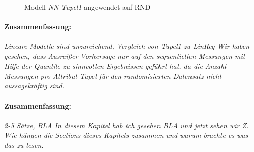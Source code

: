 \documentclass[
	12pt,
	a4paper,
	BCOR10mm,
	DIV14,
	listof=totoc,
	bibliography=totoc,
	headsepline
]{scrreprt}
\begin{document}
\begin{figure}
	\centering
	\\
	\hfill
	\caption{Modell \textit{NN-Tupel1} angewendet auf RND}
	\label{fig:tupel1_rnd}
\end{figure} 

\paragraph{Zusammenfassung:}
\textit{
	Lineare Modelle sind unzureichend, Vergleich von Tupel1 zu LinReg
	Wir haben gesehen, dass Ausreißer-Vorhersage nur auf den sequentiellen Messungen mit Hilfe der Quantile zu sinnvollen Ergebnissen geführt hat, da die Anzahl Messungen pro Attribut-Tupel für den randomisierten Datensatz nicht aussagekräftig sind.
	}
\clearpage

\paragraph{Zusammenfassung:}
\textit{2-5 Sätze, BLA In diesem Kapitel hab ich gesehen BLA und jetzt sehen wir Z. Wie hängen die Sections dieses Kapitels zusammen und warum brachte es was das zu lesen.}
\end{document}
